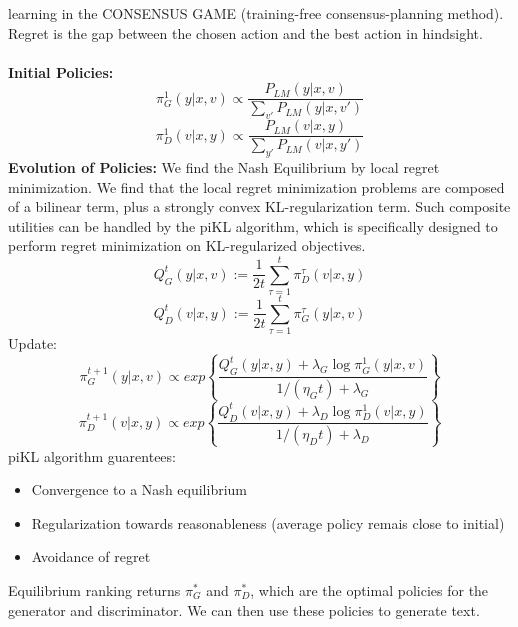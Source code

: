 \documentclass[12pt]{article}
\begin{document}
learning in the CONSENSUS GAME (training-free consensus-planning method). Regret is the gap between the chosen action and the best action
in hindsight.\\
\\
\textbf{{Initial Policies:}}
\[\pi_G^1(y|x,v) \propto \dfrac{P_{LM}(y|x,v)}{\sum_{v'}P_{LM}(y|x,v')}\]
\[\pi_D^1(v|x,y) \propto \dfrac{P_{LM}(v|x,y)}{\sum_{y'}P_{LM}(v|x,y')}\]
\textbf{Evolution of Policies:} We find the Nash Equilibrium by local regret minimization. We find that the local regret minimization problems are composed of a bilinear term, plus a strongly convex KL-regularization term. Such
composite utilities can be handled by the piKL algorithm, which is specifically
designed to perform regret minimization on KL-regularized objectives.
\[Q_G^t(y|x,v):=\dfrac{1}{2t}\sum_{\tau=1}^{t}\pi_D^\tau(v|x,y)\]
\[Q_D^t(v|x,y):=\dfrac{1}{2t}\sum_{\tau=1}^{t}\pi_G^\tau(y|x,v)\]
Update:
\[\pi_G^{t+1}(y|x,v)\propto exp \left\{\dfrac{Q_G^t(y|x,y)+\lambda_G\log \pi_G^1(y|x,v)}{1/(\eta_Gt)+\lambda_G}\right\}\]
\[\pi_D^{t+1}(v|x,y)\propto exp \left\{\dfrac{Q_D^t(v|x,y)+\lambda_D\log \pi_D^1(v|x,y)}{1/(\eta_Dt)+\lambda_D}\right\}\]
piKL algorithm guarentees:
\begin{itemize}
  \item Convergence to a Nash equilibrium
  \item Regularization towards reasonableness (average policy remais close to initial)
  \item Avoidance of regret
\end{itemize}
Equilibrium ranking returns $\pi_G^*$ and $\pi_D^*$, which are the optimal policies for the generator and discriminator. We can then use these policies to generate text.\\
\end{document}
